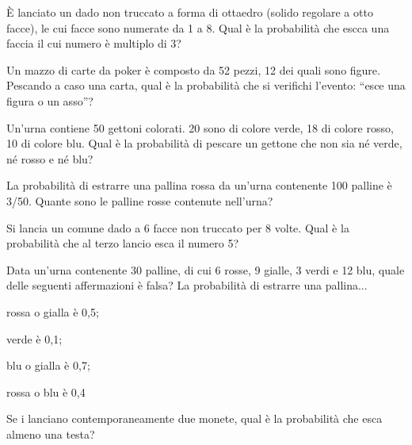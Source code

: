 \begin{esercizio} %
È lanciato un dado non truccato a forma di ottaedro (solido regolare a otto facce), le cui facce sono numerate da 1 a 8. Qual è la probabilità che escca una faccia il cui numero è multiplo di 3?
\end{esercizio}

\begin{esercizio} %
Un mazzo di carte da poker è composto da 52 pezzi, 12 dei quali sono figure. Pescando a caso una carta, qual è la probabilità che si verifichi l'evento: “esce una figura o un asso”?
\end{esercizio}

\begin{esercizio} %
Un'urna contiene 50 gettoni colorati. 20 sono di colore verde, 18 di colore rosso, 10 di colore blu. Qual è la probabilità di pescare un gettone che non sia né verde, né rosso e né blu?
\end{esercizio}

\begin{esercizio} %
La probabilità di estrarre una pallina rossa da un'urna contenente 100 palline è 3/50. Quante sono le palline rosse contenute nell'urna?
\end{esercizio}

\begin{esercizio} %
Si lancia un comune dado a 6 facce non truccato per 8 volte. Qual è la probabilità che al terzo lancio esca il numero 5?
\end{esercizio}

\begin{esercizio} %
Data un'urna contenente 30 palline, di cui 6 rosse, 9 gialle, 3 verdi e 12 blu, quale delle seguenti affermazioni è falsa? La probabilità di estrarre una pallina...
\begin{itemize*}
\item rossa o gialla è 0,5;
\item verde è 0,1;
\item blu o gialla è 0,7;
\item rossa o blu è 0,4
\end{itemize*}
\end{esercizio}

\begin{esercizio} %
Se i lanciano contemporaneamente due monete, qual è la probabilità che esca almeno una testa?
\end{esercizio}

